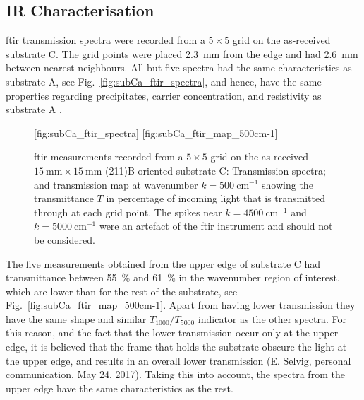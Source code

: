 \subsection{IR Characterisation}

\Ac{ftir} transmission spectra were recorded from a $5\times5$ grid on the as-received substrate C. The grid points were placed \SI{2.3}{\milli\metre} from the edge and had \SI{2.6}{\milli\metre} between nearest neighbours. All but five spectra had the same characteristics as substrate A, see Fig.~\ref{fig:subCa_ftir_spectra}, and hence, have the same properties regarding precipitates, carrier concentration, and resistivity as substrate A \citep{yujie2004infrared}.

\begin{figure}[htbp]
    \centering
    [fig:subCa_ftir_spectra]
    \hfill
    [fig:subCa_ftir_map_500cm-1]
    \caption[\Ac{ftir} measurements of the as-received substrate C.]{\Ac{ftir} measurements recorded from a $5\times5$ grid on the as-received $\SI{15}{\milli\metre}\times\SI{15}{\milli\metre}$ (211)B-oriented substrate C:  Transmission spectra; and  transmission map at wavenumber $k=\SI{500}{\centi\metre^{-1}}$ showing the transmittance $T$ in percentage of incoming light that is transmitted through at each grid point. The spikes near $k=\SI{4500}{\centi\metre^{-1}}$ and $k=\SI{5000}{\centi\metre^{-1}}$ were an artefact of the \ac{ftir} instrument and should not be considered.}
\end{figure}

The five measurements obtained from the upper edge of substrate C had transmittance between \SI{55}{\percent} and \SI{61}{\percent} in the wavenumber region of interest, which are lower than for the rest of the substrate, see Fig.~\ref{fig:subCa_ftir_map_500cm-1}. Apart from having lower transmission they have the same shape and similar $T_{1000}/T_{5000}$ indicator as the other spectra. For this reason, and the fact that the lower transmission occur only at the upper edge, it is believed that the frame that holds the substrate obscure the light at the upper edge, and results in an overall lower transmission (E. Selvig, personal communication, May 24, 2017). Taking this into account, the spectra from the upper edge have the same characteristics as the rest.



